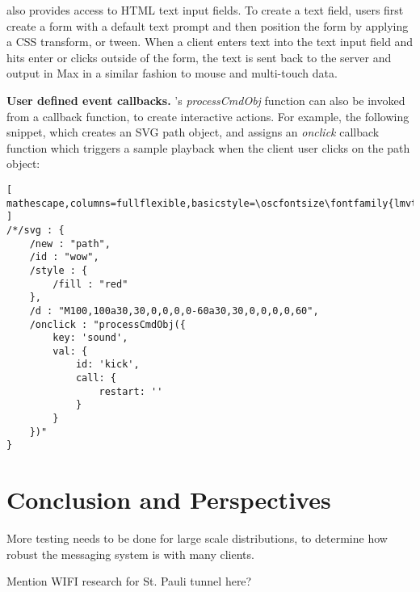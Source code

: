 \drawsocket also provides access to HTML text input fields. To create a text field, users first create a form with a default text prompt and then position the form by applying a CSS transform, or tween. When a client enters text into the text input field and hits enter or clicks outside of the form, the text is sent back to the server and output in Max in a similar fashion to mouse and multi-touch data.

\medskip
\noindent
\textbf{User defined event callbacks.}
\drawsocket's \textit{processCmdObj} function can also be invoked from a callback function, to create interactive actions. For example, the following snippet, which creates an SVG path object, and assigns an \textit{onclick} callback function which triggers a sample playback when the client user clicks on the path object:

\begin{lstlisting}[ mathescape,columns=fullflexible,basicstyle=\oscfontsize\fontfamily{lmvtt}\selectfont ]
/*/svg : {
    /new : "path",
    /id : "wow",
    /style : {
        /fill : "red"
    },
    /d : "M100,100a30,30,0,0,0,0-60a30,30,0,0,0,0,60",
    /onclick : "processCmdObj({
        key: 'sound',
        val: {
            id: 'kick',
            call: { 
                restart: '' 
            }
        }
    })"
}
\end{lstlisting}





%
%
%
%
%
%
\section{Conclusion and Perspectives}

More testing needs to be done for large scale distributions, to determine how robust the messaging system is with many clients.

Mention WIFI research for St. Pauli tunnel here?


